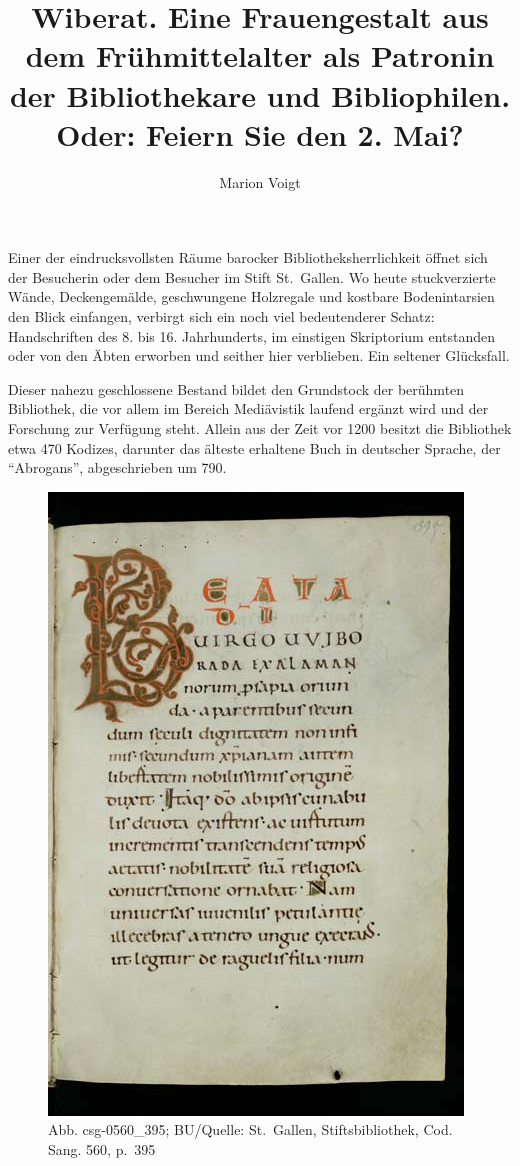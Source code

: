 \documentclass[a4paper,
fontsize=11pt,
oneside,
numbers=noperiodatend,
parskip=half-,
bibliography=totoc,
final
]{scrartcl}
\title{\LARGE{Wiberat. Eine Frauengestalt aus dem Frühmittelalter als Patronin der Bibliothekare und Bibliophilen. Oder: Feiern Sie den 2. Mai?}} %
\author{Marion Voigt} %
\date{}
\begin{document}
\maketitle
\thispagestyle{fancyplain} 


Einer der eindrucksvollsten Räume barocker Bibliotheksherrlichkeit
öffnet sich der Besucherin oder dem Besucher im Stift St.~Gallen. Wo
heute stuckverzierte Wände, Deckengemälde, geschwungene Holzregale und
kostbare Bodenintarsien den Blick einfangen, verbirgt sich ein noch viel
bedeutenderer Schatz: Handschriften des 8. bis 16. Jahrhunderts, im
einstigen Skriptorium entstanden oder von den Äbten erworben und seither
hier verblieben. Ein seltener Glücksfall.

Dieser nahezu geschlossene Bestand bildet den Grundstock der berühmten
Bibliothek, die vor allem im Bereich Mediävistik laufend ergänzt wird
und der Forschung zur Verfügung steht. Allein aus der Zeit vor 1200
besitzt die Bibliothek etwa 470 Kodizes, darunter das älteste erhaltene
Buch in deutscher Sprache, der \enquote{Abrogans}, abgeschrieben um 790.

\begin{figure}[htbp]
\centering
\includegraphics{img/Voigt01.jpg}
\caption{Abb. csg-0560\_395; BU/Quelle: St.~Gallen, Stiftsbibliothek,
Cod. Sang. 560, p.~395}
\end{figure}
\end{document}
